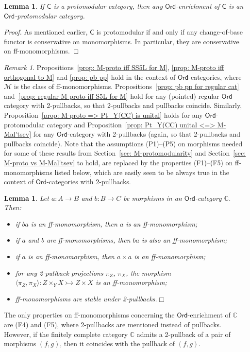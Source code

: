 \documentclass[10pt,a4paper]{amsart}
\theoremstyle{plain}
\newtheorem{lemma}[subsection]{Lemma}
\theoremstyle{definition}
\theoremstyle{remark}
\newtheorem{remark}[subsection]{Remark}
\newcommand{\C}{\ensuremath{\mathsf{C}}}
\newcommand{\CC}{\ensuremath{\mathbb{C}}}
\newcommand{\Ord}{\ensuremath{\mathsf{Ord}}}
\newcommand{\M}{\ensuremath{\mathscr{M}}}
\newcommand{\la}{\langle}
\newcommand{\ra}{\rangle}
\newcommand{\mono}{\rightarrowtail}
\begin{document}
\begin{lemma}\label{lem: proto => Ord-proto} If $\C$ is a protomodular category, then any $\Ord$-enrichment of $\C$ is an $\Ord$-pro\-to\-mo\-du\-lar category.
\end{lemma}
\begin{proof} As mentioned earlier, $\C$ is protomodular if and only if any change-of-base functor is conservative on monomorphisms. In particular, they are conservative on ff-monomorphisms.
\end{proof}

\begin{remark} Propositions~\ref{prop: M-proto iff SS5L for M}, \ref{prop: M-proto iff orthogonal to M} and \ref{prop: pb pp} hold in the context of $\Ord$-categories, where $\M$ is the class of ff-monomorphisms. Propositions~\ref{prop: pb pp for regular cat} and~\ref{prop: regular M-proto iff S5L for M} hold for any (pointed) regular $\Ord$-category with 2-pullbacks, so that 2-pullbacks and pullbacks coincide. Similarly, Proposition~\ref{prop: M-proto => Pt_Y(CC) is unital} holds for any $\Ord$-protomodular category and Proposition~\ref{prop: Pt_Y(CC) unital <=> M-Mal'tsev} for any $\Ord$-category with 2-pullbacks (again, so that 2-pullbacks and pullbacks coincide). Note that the assumptions (P1)--(P5) on morphisms needed for some of these results from Section~\ref{sec: M-protomodularity} and Section~\ref{sec: M-proto vs M-Mal'tsev} to hold, are replaced by the properties (F1)--(F5) on ff-monomorphisms listed below, which are easily seen to be always true in the context of $\Ord$-categories with 2-pullbacks.
\end{remark}
\begin{lemma}\label{pps for ff-ms}
Let $a\colon A\to B$ and $b\colon B\to C$ be morphisms in an $\Ord$-category $\CC$. Then:
\begin{itemize}
	\item[(F1)] if $ba$ is an ff-monomorphism, then $a$ is an ff-monomorphism;
	\item[(F2)] if $a$ and $b$ are ff-monomorphisms, then $ba$ is also an ff-monomorphism;
	\item[(F3)] if $a$ is an ff-monomorphism, then $a\times a$ is an ff-monomorphism;
	\item[(F4)] for any 2-pullback projections $\pi_Z$, $\pi_X$, the morphism $\la \pi_Z,\pi_X\ra\colon Z\times_Y X\mono Z\times X$ is an ff-monomorphism;
	\item[(F5)] ff-monomorphisms are stable under 2-pullbacks.\hfill $\Box$
\end{itemize}
\end{lemma}
The only properties on ff-monomorphisms concerning the $\Ord$-enrichment of $\CC$ are (F4) and (F5), where 2-pullbacks are mentioned instead of pullbacks. However, if the finitely complete category $\CC$ admits a 2-pullback of a pair of morphisms $(f,g)$, then it coincides with the pullback of $(f,g)$.
\end{document}
